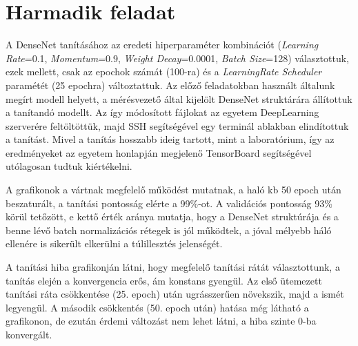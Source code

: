 \newpage
\newpage

\section{Harmadik feladat}
A DenseNet tanításához az eredeti hiperparaméter kombinációt (\textit{Learning Rate}=0.1, \textit{Momentum}=0.9, \textit{Weight Decay}=0.0001, \textit{Batch Size}=128) választottuk, ezek mellett, csak az epochok számát (100-ra) és a \textit{LearningRate Scheduler} paramétét (25 epochra) változtattuk. Az előző feladatokban használt általunk megírt modell helyett, a mérésvezető által kijelölt DenseNet struktárára állítottuk a tanítandó modellt. Az így módosított fájlokat az egyetem DeepLearning szerverére feltöltöttük, majd SSH segítségével egy terminál ablakban elindítottuk a tanítást. Mivel a tanítás hosszabb ideig tartott, mint a laboratórium, így az eredményeket az egyetem honlapján megjelenő TensorBoard segítségével utólagosan tudtuk kiértékelni.

A grafikonok a vártnak megfelelő működést mutatnak, a haló kb 50 epoch után beszaturált, a tanítási pontosság elérte a 99\%-ot. A validációs pontosság 93\% körül tetőzött, e kettő érték aránya mutatja, hogy a DenseNet struktúrája és a benne lévő batch normalizációs rétegek is jól működtek, a jóval mélyebb háló ellenére is sikerült elkerülni a túlillesztés jelenségét.

A tanítási hiba grafikonján látni, hogy megfelelő tanítási rátát választottunk, a tanítás elején a konvergencia erős, ám konstans gyengül. Az első ütemezett tanítási ráta csökkentése (25. epoch) után ugrásszerűen növekszik, majd a ismét legyengül. A második csökkentés (50. epoch után) hatása még látható a grafikonon, de ezután érdemi változást nem lehet látni, a hiba szinte 0-ba konvergált.

